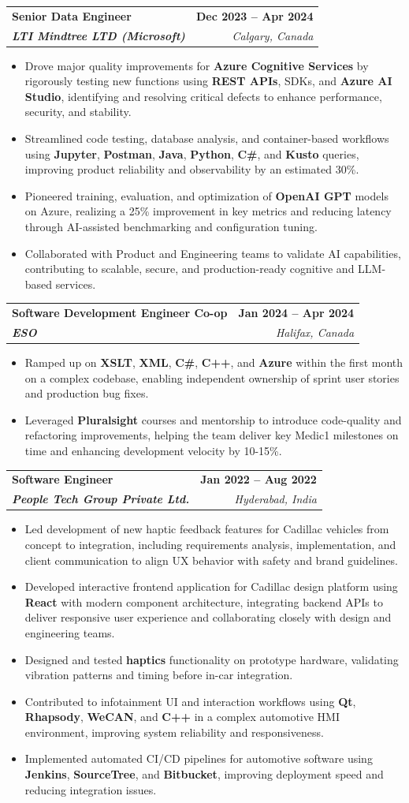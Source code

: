 \documentclass[letterpaper,11pt]{article}
\makeatletter
\newcommand{\resumeItem}[1]{
  \item\small{
    {#1 \vspace{-2pt}}
  }
}
\newcommand{\resumeSubheading}[4]{
  \vspace{-2pt}\item
    \begin{tabular*}{1.0\textwidth}[t]{l@{\extracolsep{\fill}}r}
      \textbf{#1} & \textbf{\small #2} \\
      \textit{\small#3} & \textit{\small #4} \\
    \end{tabular*}\vspace{-7pt}
}
\newcommand{\resumeItemListStart}{\begin{itemize}}
\newcommand{\resumeItemListEnd}{\end{itemize}\vspace{-5pt}}
\makeatother
\begin{document}
    \resumeSubheading
      {Senior Data Engineer}{\textbf{Dec 2023 -- Apr 2024}}
      {\textbf{LTI Mindtree LTD (Microsoft)}}{Calgary, Canada}
      \resumeItemListStart
        \resumeItem{Drove major quality improvements for \textbf{Azure Cognitive Services} by rigorously testing new functions using \textbf{REST APIs}, SDKs, and \textbf{Azure AI Studio}, identifying and resolving critical defects to enhance performance, security, and stability.}
        \resumeItem{Streamlined code testing, database analysis, and container-based workflows using \textbf{Jupyter}, \textbf{Postman}, \textbf{Java}, \textbf{Python}, \textbf{C\#}, and \textbf{Kusto} queries, improving product reliability and observability by an estimated 30\%.}
        \resumeItem{Pioneered training, evaluation, and optimization of \textbf{OpenAI GPT} models on Azure, realizing a 25\% improvement in key metrics and reducing latency through AI-assisted benchmarking and configuration tuning.}
        \resumeItem{Collaborated with Product and Engineering teams to validate AI capabilities, contributing to scalable, secure, and production-ready cognitive and LLM-based services.}
      \resumeItemListEnd
    
    \resumeSubheading
      {Software Development Engineer Co-op}{\textbf{Jan 2024 -- Apr 2024}}
      {\textbf{ESO}}{Halifax, Canada}
      \resumeItemListStart
        \resumeItem{Ramped up on \textbf{XSLT}, \textbf{XML}, \textbf{C\#}, \textbf{C++}, and \textbf{Azure} within the first month on a complex codebase, enabling independent ownership of sprint user stories and production bug fixes.}
        \resumeItem{Leveraged \textbf{Pluralsight} courses and mentorship to introduce code-quality and refactoring improvements, helping the team deliver key Medic1 milestones on time and enhancing development velocity by 10-15\%.}
      \resumeItemListEnd

    \resumeSubheading
      {Software Engineer}{\textbf{Jan 2022 -- Aug 2022}}
      {\textbf{People Tech Group Private Ltd.}}{Hyderabad, India}
      \resumeItemListStart
        \resumeItem{Led development of new haptic feedback features for Cadillac vehicles from concept to integration, including requirements analysis, implementation, and client communication to align UX behavior with safety and brand guidelines.}
        \resumeItem{Developed interactive frontend application for Cadillac design platform using \textbf{React} with modern component architecture, integrating backend APIs to deliver responsive user experience and collaborating closely with design and engineering teams.}
        \resumeItem{Designed and tested \textbf{haptics} functionality on prototype hardware, validating vibration patterns and timing before in-car integration.}
        \resumeItem{Contributed to infotainment UI and interaction workflows using \textbf{Qt}, \textbf{Rhapsody}, \textbf{WeCAN}, and \textbf{C++} in a complex automotive HMI environment, improving system reliability and responsiveness.}
        \resumeItem{Implemented automated CI/CD pipelines for automotive software using \textbf{Jenkins}, \textbf{SourceTree}, and \textbf{Bitbucket}, improving deployment speed and reducing integration issues.}
      \resumeItemListEnd
\end{document}
